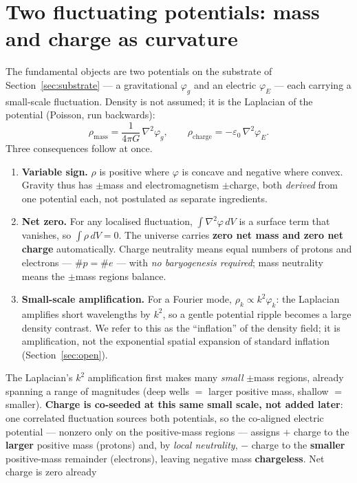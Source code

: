 \documentclass[11pt]{article}
\newcommand{\grad}{\nabla}
\begin{document}
\section{Two fluctuating potentials: mass and charge as curvature}\label{sec:origin}
The fundamental objects are two potentials on the substrate of Section~\ref{sec:substrate} --- a
gravitational $\varphi_g$ and an electric $\varphi_E$ --- each carrying a small-scale fluctuation.
Density is not assumed; it is the Laplacian of the potential (Poisson, run backwards):
\begin{equation}
\rho_{\text{mass}} = \frac{1}{4\pi G}\,\grad^2\varphi_g,
\qquad
\rho_{\text{charge}} = -\varepsilon_0\,\grad^2\varphi_E .
\end{equation}
Three consequences follow at once.
\begin{enumerate}
\item \textbf{Variable sign.} $\rho$ is positive where $\varphi$ is concave and negative where convex.
Gravity thus has $\pm$mass and electromagnetism $\pm$charge, both \emph{derived} from one potential
each, not postulated as separate ingredients.
\item \textbf{Net zero.} For any localised fluctuation, $\int\grad^2\varphi\,dV$ is a surface term
that vanishes, so $\int\rho\,dV=0$. The universe carries \textbf{zero net mass and zero net charge}
automatically. Charge neutrality means equal numbers of protons and electrons --- $\#p=\#e$ --- with
\emph{no baryogenesis required}; mass neutrality means the $\pm$mass regions balance.
\item \textbf{Small-scale amplification.} For a Fourier mode, $\rho_k\propto k^2\varphi_k$: the
Laplacian amplifies short wavelengths by $k^2$, so a gentle potential ripple becomes a large density
contrast. We refer to this as the ``inflation'' of the density field; it is amplification, not the
exponential spatial expansion of standard inflation (Section~\ref{sec:open}).
\end{enumerate}
The Laplacian's $k^2$ amplification first makes many \emph{small} $\pm$mass regions, already spanning a
range of magnitudes (deep wells $=$ larger positive mass, shallow $=$ smaller). \textbf{Charge is co-seeded
at this same small scale, not added later}: one correlated fluctuation sources both potentials, so the
co-aligned electric potential --- nonzero only on the positive-mass regions --- assigns $+$ charge to the
\textbf{larger} positive mass (protons) and, by \emph{local neutrality}, $-$ charge to the \textbf{smaller}
positive-mass remainder (electrons), leaving negative mass \textbf{chargeless}. Net charge is zero already
\end{document}

